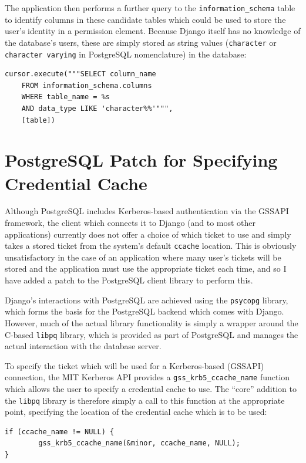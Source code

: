 \documentclass{report}
\begin{document}
The application then performs a further query to the \verb+information_schema+ table to identify columns in these candidate tables which could be used to store the user's identity in a permission element. Because Django itself has no knowledge of the database's users, these are simply stored as string values (\texttt{character} or \texttt{character varying} in PostgreSQL nomenclature) in the database:

\begin{verbatim}
cursor.execute("""SELECT column_name
    FROM information_schema.columns
    WHERE table_name = %s
    AND data_type LIKE 'character%%'""",
    [table])
\end{verbatim}

\section{PostgreSQL Patch for Specifying Credential Cache}
\label{sec:postgresql_patch}
Although PostgreSQL includes Kerberos-based authentication via the GSSAPI framework\cite{postgres-GSSAPI}, the client which connects it to Django (and to most other applications) currently does not offer a choice of which ticket to use and simply takes a stored ticket from the system's default \texttt{ccache} location. This is obviously unsatisfactory in the case of an application where many user's tickets will be stored and the application must use the appropriate ticket each time, and so I have added a patch to the PostgreSQL client library to perform this.

Django's interactions with PostgreSQL are achieved using the \texttt{psycopg} library, which forms the basis for the PostgreSQL backend which comes with Django. However, much of the actual library functionality is simply a wrapper around the C-based \texttt{libpq} library, which is provided as part of PostgreSQL and manages the actual interaction with the database server.


To specify the ticket which will be used for a Kerberos-based (GSSAPI) connection, the MIT Kerberos API provides a \verb+gss_krb5_ccache_name+ function which allows the user to specify a credential cache to use. The ``core'' addition to the \texttt{libpq} library is therefore simply a call to this function at the appropriate point, specifying the location of the credential cache which is to be used:

\begin{verbatim}
if (ccache_name != NULL) {
        gss_krb5_ccache_name(&minor, ccache_name, NULL);
}
\end{verbatim}
\end{document}
